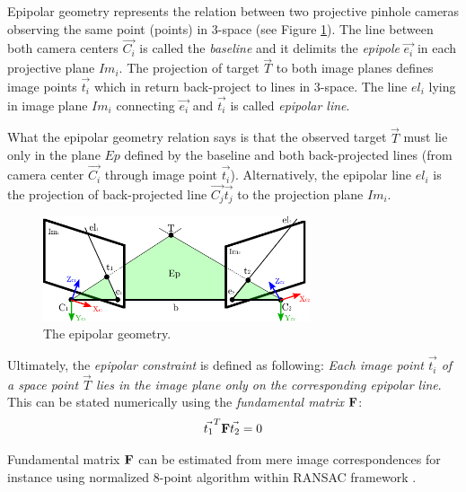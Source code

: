 Epipolar geometry represents the relation between two projective pinhole cameras observing the same point (points) in 3-space \cite{Cyganek:2007:ICV:1214366} (see Figure \ref{fig:epipolar_geometry}). The line between both camera centers $\vec{C_{i}}$ is called the \textit{baseline} and it delimits the \textit{epipole} $ \vec{e_{i}}$ in each projective plane $Im_{i}$. The projection of target $\vec{T}$ to both image planes defines image points $\vec{t_{i}}$ which in return back-project to lines in 3-space. The line $el_{i}$ lying in image plane $Im_{i}$ connecting $\vec{e_{i}}$ and ${\vec{t_{i}}}$ is called \textit{epipolar line}.

What the epipolar geometry relation says is that the observed target $\vec{T}$ must lie only in the plane $Ep$ defined by the baseline and both back-projected lines (from camera center $\vec{C_{i}}$ through image point $\vec{t_{i}}$). Alternatively, the epipolar line $el_{i}$ is the projection of back-projected line $\vec{C_{j}}\vec{t_{j}}$ to the projection plane $Im_{i}$.

\begin{figure}[tbh]
	\centering
	\includegraphics[width=0.7\textwidth]{fig/epipolar_geometry.pdf}
	\caption{The epipolar geometry.}
	\label{fig:epipolar_geometry}
\end{figure}

Ultimately, the \textit{epipolar constraint} is defined as following: \textit{Each image point $\vec{t_{i}}$ of a space point $\vec{T}$ lies in the image plane only on the corresponding epipolar line}. This can be stated numerically using the \textit{fundamental matrix} $\mathbf{F}$:
\begin{align}
	\vec{t_{1}}^{T}\mathbf{F}\vec{t_{2}} = 0
\end{align}

Fundamental matrix $\mathbf{F}$ can be estimated from mere image correspondences for instance using normalized 8-point algorithm within RANSAC framework \cite{Hartley:2003:MVG:861369, Cyganek:2007:ICV:1214366}.

